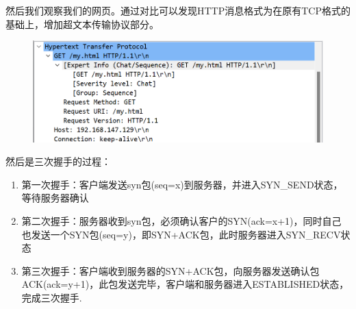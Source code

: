 \documentclass[UTF8,a4paper,10pt]{ctexart}
\begin{document}
然后我们观察我们的网页。通过对比可以发现HTTP消息格式为在原有TCP格式的基础上，增加超文本传输协议部分。
\begin{figure}[H]
    \centering
    \includegraphics[scale=0.5]{11.png}
    \label{fig:11}
\end{figure}
然后是三次握手的过程：
\begin{enumerate}
  \item 第一次握手：客户端发送syn包(seq=x)到服务器，并进入SYN\_SEND状态，等待服务器确认
  \item 第二次握手：服务器收到syn包，必须确认客户的SYN(ack=x+1)，同时自己也发送一个SYN包(seq=y)，即SYN+ACK包，此时服务器进入SYN\_RECV状态
  \item 第三次握手：客户端收到服务器的SYN+ACK包，向服务器发送确认包ACK(ack=y+1)，此包发送完毕，客户端和服务器进入ESTABLISHED状态，完成三次握手.
\end{enumerate}
\end{document}
